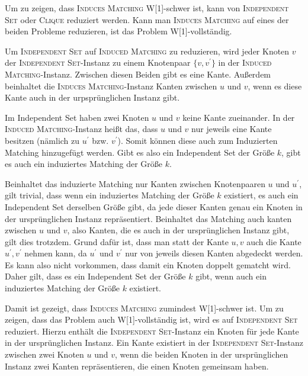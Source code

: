 

\DeclareMathOperator{\vc}{vc}




Um zu zeigen, dass \textsc{Induces Matching} W[1]-schwer ist, kann von \textsc{Independent Set} oder \textsc{Clique} reduziert werden. Kann man \textsc{Induces Matching} auf eines der beiden Probleme reduzieren, ist das Problem W[1]-vollständig.

Um \textsc{Independent Set} auf \textsc{Induced Matching} zu reduzieren, wird jeder Knoten $v$ der \textsc{Independent Set}-Instanz zu einem Knotenpaar $\{v, v^\prime \}$ in der \textsc{Induced Matching}-Instanz. Zwischen diesen Beiden gibt es eine Kante. Außerdem beinhaltet die \textsc{Induces Matching}-Instanz Kanten zwischen $u$ und $v$, wenn es diese Kante auch in der urpsprünglichen Instanz gibt. 

Im Independent Set haben zwei Knoten $u$ und $v$ keine Kante zueinander. In der \textsc{Induced Matching}-Instanz heißt das, dass $u$ und $v$ nur jeweils eine Kante besitzen (nämlich zu $u^\prime$ bzw. $v^\prime$). Somit können diese auch zum Induzierten Matching hinzugefügt werden. Gibt es also ein Independent Set der Größe $k$, gibt es auch ein induziertes Matching der Größe $k$.

Beinhaltet das induzierte Matching nur Kanten zwischen Knotenpaaren $u$ und $u^\prime$, gilt trivial, dass wenn ein induziertes Matching der Größe $k$ existiert, es auch ein Independent Set derselben Größe gibt, da jede dieser Kanten genau ein Knoten in der ursprünglichen Instanz repräsentiert. Beinhaltet das Matching auch kanten zwischen $u$ und $v$, also Kanten, die es auch in der ursprünglichen Instanz gibt, gilt dies trotzdem. Grund dafür ist, dass man statt der Kante $u,v$ auch die Kante $u^\prime , v^\prime$ nehmen kann, da $u^\prime$ und $v^\prime$ nur von jeweils diesen Kanten abgedeckt werden. Es kann also nicht vorkommen, dass damit ein Knoten doppelt gematcht wird. Daher gilt, dass es ein Independent Set der Größe $k$ gibt, wenn auch ein induziertes Matching der Größe $k$ existiert.

Damit ist gezeigt, dass \textsc{Induces Matching} zumindest W[1]-schwer ist. Um zu zeigen, dass das Problem auch W[1]-vollständig ist, wird es auf \textsc{Independent Set} reduziert. Hierzu enthält die \textsc{Independent Set}-Instanz ein Knoten für jede Kante in der ursprünglichen Instanz. Ein Kante existiert in der \textsc{Independent Set}-Instanz zwischen zwei Knoten $u$ und $v$, wenn die beiden Knoten in der ursprünglichen Instanz zwei Kanten repräsentieren, die einen Knoten gemeinsam haben.

